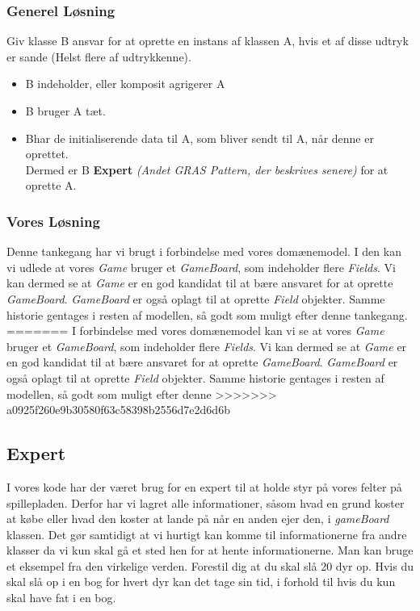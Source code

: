 \subsubsection*{Generel Løsning}
Giv klasse B ansvar for at oprette en instans af klassen A, hvis et af disse udtryk er sande (Helst flere af udtrykkenne).
\begin{itemize}
\item B indeholder, eller komposit agrigerer A
\item B bruger A tæt.
\item Bhar de initialiserende data til A, som bliver sendt til A, når denne er oprettet.
\\
Dermed er B \textbf{Expert} \textit{(Andet GRAS Pattern, der beskrives senere)} for at oprette A.
\end{itemize}
\subsubsection*{Vores Løsning}
Denne tankegang har vi brugt i forbindelse med vores domænemodel. I den kan vi udlede at vores \textit{Game} bruger et \textit{GameBoard}, som indeholder flere \textit{Fields}. Vi kan dermed se at \textit{Game} er en god kandidat til at bære ansvaret for at oprette \textit{GameBoard}. \textit{GameBoard} er også oplagt til at oprette \textit{Field} objekter. Samme historie gentages i resten af modellen, så godt som muligt efter denne tankegang.
=======
I forbindelse med vores domænemodel kan vi se at vores \textit{Game} bruger et \textit{GameBoard}, som indeholder flere \textit{Fields}. Vi kan dermed se at \textit{Game} er en god kandidat til at bære ansvaret for at oprette \textit{GameBoard}. \textit{GameBoard} er også oplagt til at oprette \textit{Field} objekter. Samme historie gentages i resten af modellen, så godt som muligt efter denne
>>>>>>> a0925f260e9b30580f63c58398b2556d7e2d6d6b
\subsection{Expert}
I vores kode har der været brug for en expert til at holde styr på vores felter på spillepladen. Derfor har vi lagret alle informationer, såsom hvad en grund koster at købe eller hvad den koster at lande på når en anden ejer den, i \textit{gameBoard} klassen. Det gør samtidigt at vi hurtigt kan komme til informationerne fra andre klasser da vi kun skal gå et sted hen for at hente informationerne. 
Man kan bruge et eksempel fra den virkelige verden. Forestil dig at du skal slå 20 dyr op. Hvis du skal slå op i en bog for hvert dyr kan det tage sin tid, i forhold til hvis du kun skal have fat i en bog.
\\
